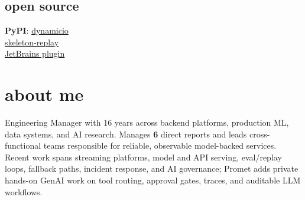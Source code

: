 \documentclass[]{../../../../friggeri-cv}
\begin{document}
\begin{aside}
    \section{open source}
        {\footnotesize \textbf{PyPI}: \href{https://pypi.org/project/dynamicio/}{dynamicio}\\\href{https://pypi.org/project/skeleton-replay/}{skeleton-replay}\\\href{https://plugins.jetbrains.com/plugin/32807-skeleton-replay}{JetBrains plugin}}
\end{aside}

\section{about me}
{\normalsize Engineering Manager with 16 years across backend platforms, production ML, data systems, and AI research. Manages \textbf{6} direct reports and leads cross-functional teams responsible for reliable, observable model-backed services. Recent work spans streaming platforms, model and API serving, eval/replay loops, fallback paths, incident response, and AI governance; Promet adds private hands-on GenAI work on tool routing, approval gates, traces, and auditable LLM workflows.}
\end{document}
